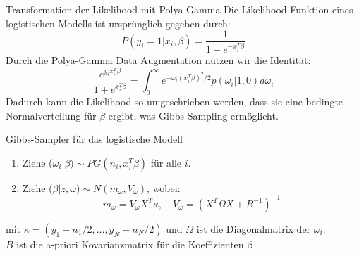 \documentclass{beamer}
\begin{document}
\begin{frame}{Transformation der Likelihood mit Polya-Gamma}
	Die Likelihood-Funktion eines logistischen Modells ist ursprünglich gegeben durch:
	\begin{equation}
		P(y_i = 1 | x_i, \beta) = \frac{1}{1 + e^{-x_i^T \beta}}
	\end{equation}
	Durch die Polya-Gamma Data Augmentation nutzen wir die Identität:
	\begin{equation}
		\frac{e^{y_i x_i^T \beta}}{1 + e^{x_i^T \beta}} = \int_0^\infty e^{-\omega_i (x_i^T \beta)^2 / 2} p(\omega_i | 1, 0) d\omega_i
	\end{equation}
	Dadurch kann die Likelihood so umgeschrieben werden, dass sie eine bedingte Normalverteilung für $\beta$ ergibt, was Gibbs-Sampling ermöglicht.
\end{frame}




	\begin{frame}{Gibbs-Sampler für das logistische Modell}
		\begin{enumerate}
			\item Ziehe ($\omega_i | \beta) \sim PG(n_i, x_i^T \beta)$ für alle $i$.
			\item Ziehe ($\beta | z, \omega) \sim N(m_{\omega}, V_{\omega})$, wobei:
			\begin{equation}
				m_{\omega} = V_{\omega} X^T \kappa, \quad V_{\omega} = (X^T \Omega X + B^{-1})^{-1}
			\end{equation}
		\end{enumerate}
	mit $\kappa = (y_1-n_1/2,...,y_N-n_N/2)$ und $\Omega$ ist die Diagonalmatrix der $\omega_i$. \\ 
	$B$  ist die a-priori Kovarianzmatrix für die Koeffizienten  $\beta$ 
	\end{frame}
	
	
\end{document}
